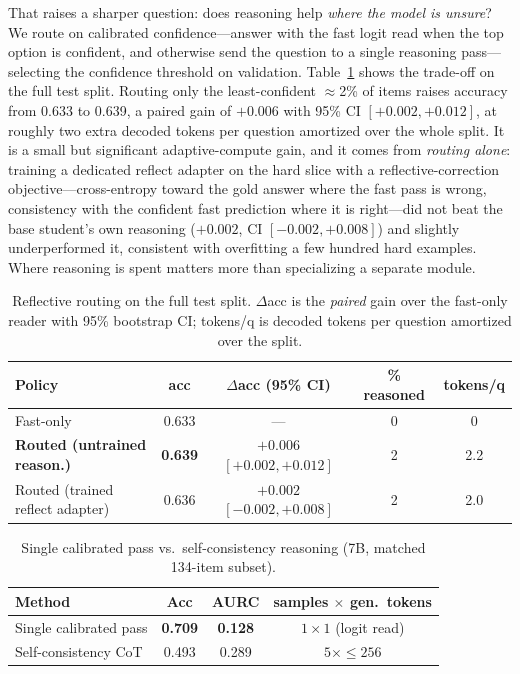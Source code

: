 \documentclass[conference]{IEEEtran}
\begin{document}
That raises a sharper question: does reasoning help \emph{where the model is unsure}? We route on calibrated confidence---answer with the fast logit read when the top option is confident, and otherwise send the question to a single reasoning pass---selecting the confidence threshold on validation. Table~\ref{tab:r3} shows the trade-off on the full test split. Routing only the least-confident $\approx$2\% of items raises accuracy from 0.633 to 0.639, a paired gain of $+0.006$ with 95\% CI $[+0.002,+0.012]$, at roughly two extra decoded tokens per question amortized over the whole split. It is a small but significant adaptive-compute gain, and it comes from \emph{routing alone}: training a dedicated reflect adapter on the hard slice with a reflective-correction objective---cross-entropy toward the gold answer where the fast pass is wrong, consistency with the confident fast prediction where it is right---did not beat the base student's own reasoning ($+0.002$, CI $[-0.002,+0.008]$) and slightly underperformed it, consistent with overfitting a few hundred hard examples. Where reasoning is spent matters more than specializing a separate module.

\begin{table}[tb]
\caption{Reflective routing on the full test split. $\Delta$acc is the \emph{paired} gain over the fast-only reader with 95\% bootstrap CI; tokens/q is decoded tokens per question amortized over the split.}
\label{tab:r3}
\centering
\small
\setlength{\tabcolsep}{3pt}
\begin{tabular}{@{}lcccc@{}}
\toprule
Policy & acc & $\Delta$acc (95\% CI) & \% reasoned & tokens/q \\
\midrule
Fast-only & 0.633 & --- & 0 & 0 \\
\textbf{Routed (untrained reason.)} & \textbf{0.639} & $\mathbf{+0.006}$ $[+0.002,+0.012]$ & 2 & 2.2 \\
Routed (trained reflect adapter) & 0.636 & $+0.002$ $[-0.002,+0.008]$ & 2 & 2.0 \\
\bottomrule
\end{tabular}
\end{table}

\begin{table}[tb]
\caption{Single calibrated pass vs.\ self-consistency reasoning (7B, matched 134-item subset).}
\label{tab:sc}
\centering
\small
\setlength{\tabcolsep}{4pt}
\begin{tabular}{@{}lccc@{}}
\toprule
Method & Acc & AURC & samples $\times$ gen.\ tokens \\
\midrule
Single calibrated pass & \textbf{0.709} & \textbf{0.128} & $1\times1$ (logit read) \\
Self-consistency CoT & 0.493 & 0.289 & $5\times{\le}256$ \\
\bottomrule
\end{tabular}
\end{table}
\end{document}
